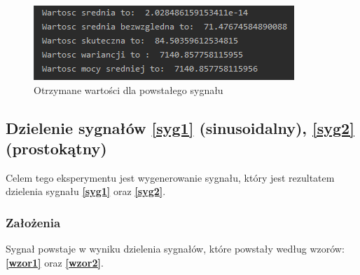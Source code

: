 \documentclass[12pt]{article}
\begin{document}
\begin{figure}[H]
\centering
\includegraphics[scale=0.8]{mnozenieSinusTrojkatParam.png}
\caption{Otrzymane wartości dla powstałego sygnału}
\end{figure}

\subsection{Dzielenie sygnałów \ref{syg1} (sinusoidalny), \ref{syg2} (prostokątny)}
\label{syg8}
Celem tego eksperymentu jest wygenerowanie sygnału, który jest rezultatem dzielenia sygnału  \textbf{\ref{syg1}} oraz  \textbf{\ref{syg2}}.
\subsubsection{Założenia}
Sygnał powstaje w wyniku dzielenia sygnałów, które powstały według wzorów:  \textbf{\ref{wzor1}} oraz  \textbf{\ref{wzor2}}.
\end{document}
